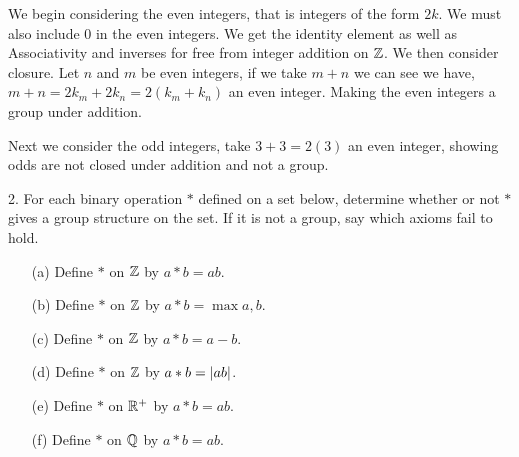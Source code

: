 \begin{mdframed}[style=darkAnswer,frametitle={Joe Starr}]
  We begin considering the even integers, that is integers of the form $2k$. We
  must also include 0 in the even integers. We get the identity element as well
  as Associativity and inverses for free from integer addition on $\mathbb{Z}$.
  We then consider closure. Let $n$ and $m$ be even integers, if we take $m+n$
  we can see we have, $m+n=2k_m+2k_n=2(k_m+k_n)$ an even integer. Making the
  even integers a group under addition.

  Next we consider the odd integers, take $3+3=2(3)$ an even integer, showing
  odds are not closed under addition and not a group.
\end{mdframed}
\newpage
\begin{mdframed}[style=darkQuesion]
  2. For each binary operation $\ast$ defined on a set below,
  determine whether or not $\ast$ gives a group structure on the set.
  If it is not a group, say which axioms fail to hold.
  \begin{multicols}{2}
    \begin{itemize}
      \item[(a)]{Define $\ast$ on $\mathbb{Z}$ by $a\ast b=ab$.}
      \item[(b)]{Define $\ast$ on $\mathbb{Z}$ by $a\ast b=\max{a,b}$.}
      \item[(c)]{Define $\ast$ on $\mathbb{Z}$ by $a\ast b=a-b$.}
      \item[(d)]{Define $\ast$ on $\mathbb{Z}$ by $a\ast b=\left\vert ab\right\vert$.}
      \item[(e)]{Define $\ast$ on $\mathbb{R}^{+}$ by $a\ast b=ab$.}
      \item[(f)]{Define $\ast$ on $\mathbb{Q}$ by $a\ast b=ab$.}
    \end{itemize}
  \end{multicols}
\end{mdframed}

